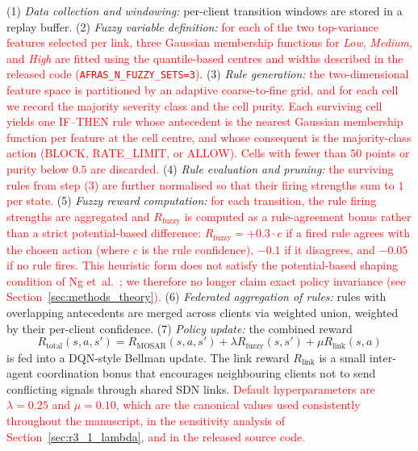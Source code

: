 \documentclass[journal]{IEEEtran}
\newcommand{\rev}[1]{\textcolor{red}{#1}}
\begin{document}
(1) \emph{Data collection and
windowing:} per-client transition windows are stored in a replay buffer.
(2) \emph{Fuzzy variable definition:} \rev{for each of the two top-variance features selected per link, three Gaussian membership functions for \emph{Low}, \emph{Medium}, and \emph{High} are fitted using the quantile-based centres and widths described in the released code (\texttt{AFRAS\_N\_FUZZY\_SETS=3})}. (3) \emph{Rule
generation:} \rev{the two-dimensional feature space is partitioned by an adaptive coarse-to-fine grid, and for each cell we record the majority severity class and the cell purity. Each surviving cell yields one IF--THEN rule whose antecedent is the nearest Gaussian membership function per feature at the cell centre, and whose consequent is the majority-class action (BLOCK, RATE\_LIMIT, or ALLOW). Cells with fewer than $50$ points or purity below $0.5$ are discarded.} (4) \emph{Rule evaluation and
pruning:} \rev{the surviving rules from step (3) are further normalised so that their firing strengths sum to $1$ per state.}
(5) \emph{Fuzzy reward computation:} \rev{for each transition, the rule firing strengths are aggregated and $R_{\text{fuzzy}}$ is computed as a rule-agreement bonus rather than a strict potential-based difference: $R_{\text{fuzzy}} = +0.3\cdot c$ if a fired rule agrees with the chosen action (where $c$ is the rule confidence), $-0.1$ if it disagrees, and $-0.05$ if no rule fires. This heuristic form does not satisfy the potential-based shaping condition of Ng et~al.~\cite{ng1999policy_invariance}; we therefore no longer claim exact policy invariance (see Section~\ref{sec:methods_theory}).}
(6) \emph{Federated aggregation of rules:} rules with overlapping
antecedents are merged across clients via weighted union, weighted by
their per-client confidence. (7) \emph{Policy update:} the combined
reward
\begin{equation}\label{eq:total}
R_{\text{total}}(s,a,s') = R_{\text{MOSAR}}(s,a,s')
 + \lambda R_{\text{fuzzy}}(s,s')
 + \mu R_{\text{link}}(s,a)
\end{equation}
is fed into a DQN-style Bellman update. The link reward $R_{\text{link}}$
is a small inter-agent coordination bonus that encourages neighbouring
clients not to send conflicting signals through shared SDN links.
\rev{Default hyperparameters are $\lambda = 0.25$ and $\mu = 0.10$, which are the canonical values used consistently throughout the manuscript, in the sensitivity analysis of Section~\ref{sec:r3_1_lambda}, and in the released source code.}
\end{document}
